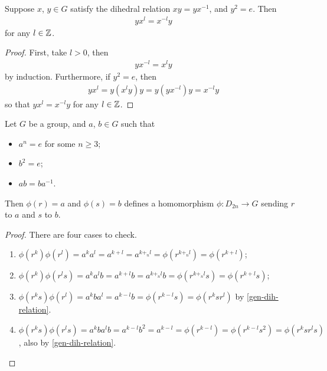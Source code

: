 \documentclass{../template/note}
\begin{document}
    \begin{lemma}
        \label{gen-dih-relation}
        Suppose \(x\), \(y \in G\) satisfy the dihedral relation \(xy = yx^{-1}\), and \(y^2=e\). Then
        \begin{align*}
            yx^l = x^{-l}y
        \end{align*}
        for any \(l \in \mathbb Z\).        
    \end{lemma}
    
    \begin{proof}
        First, take \(l>0\), then
        \begin{align*}
            yx^{-l} = x^ly
        \end{align*}
        by induction. Furthermore, if \(y^2 = e\), then
        \begin{align*}
            yx^l = y (x^l y) y = y(yx^{-l})y = x^{-l}y
        \end{align*}
        so that \(yx^l = x^{-l}y\) for any \(l \in \mathbb Z\).
    \end{proof}
    
    \begin{lemma}
        Let \(G\) be a group, and \(a\), \(b \in G\) such that
        \begin{itemize}
            \item \(a^n = e\) for some \(n \geq 3\);
            \item \(b^2 = e\);
            \item \(ab = ba^{-1}\).
        \end{itemize}
        Then \(\phi(r) = a\) and \(\phi(s) = b\) defines a homomorphism \(\phi: D_{2n} \to G\) sending \(r\) to \(a\) and \(s\) to \(b\).
    \end{lemma}
    
    \begin{proof}
        There are four cases to check.
        \begin{enumerate}[label=\protect\circled{\arabic*}]
            \item \(\phi(r^k)\phi(r^l) = a^ka^l = a^{k+l} = a^{k+_nl} = \phi(r^{k+_nl}) = \phi(r^{k+l})\);
            \item \(\phi(r^k)\phi(r^ls) = a^ka^lb = a^{k+l}b = a^{k+_nl}b = \phi(r^{k+_nl}s) = \phi(r^{k+l}s)\);
            \item \(\phi(r^ks)\phi(r^l) = a^kba^l = a^{k-l}b = \phi(r^{k-l}s) = \phi(r^ksr^l)\) by \cref{gen-dih-relation}.
            \item \(\phi(r^ks)\phi(r^ls) = a^k b a^l b = a^{k-l} b^2 = a^{k-l} = \phi(r^{k-l}) = \phi(r^{k-l}s^2) = \phi(r^k s r^l s)\), also by \cref{gen-dih-relation}.
        \end{enumerate}
    \end{proof}
    
\end{document}
